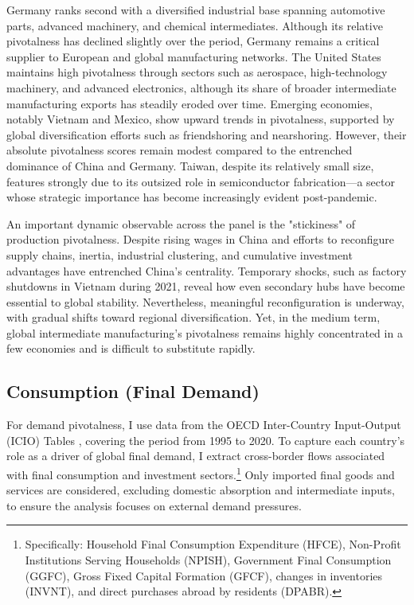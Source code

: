 \documentclass[11pt]{article}
\begin{document}
Germany ranks second with a diversified industrial base spanning automotive parts, advanced machinery, and chemical intermediates. Although its relative pivotalness has declined slightly over the period, Germany remains a critical supplier to European and global manufacturing networks. The United States maintains high pivotalness through sectors such as aerospace, high-technology machinery, and advanced electronics, although its share of broader intermediate manufacturing exports has steadily eroded over time. Emerging economies, notably Vietnam and Mexico, show upward trends in pivotalness, supported by global diversification efforts such as friendshoring and nearshoring. However, their absolute pivotalness scores remain modest compared to the entrenched dominance of China and Germany. Taiwan, despite its relatively small size, features strongly due to its outsized role in semiconductor fabrication—a sector whose strategic importance has become increasingly evident post-pandemic.

An important dynamic observable across the panel is the "stickiness" of production pivotalness. Despite rising wages in China and efforts to reconfigure supply chains, inertia, industrial clustering, and cumulative investment advantages have entrenched China’s centrality. Temporary shocks, such as factory shutdowns in Vietnam during 2021, reveal how even secondary hubs have become essential to global stability. Nevertheless, meaningful reconfiguration is underway, with gradual shifts toward regional diversification. Yet, in the medium term, global intermediate manufacturing's pivotalness remains highly concentrated in a few economies and is difficult to substitute rapidly.

\subsection{Consumption (Final Demand)}

For demand pivotalness, I use data from the OECD Inter-Country Input-Output (ICIO) Tables \citep{oecdicio2023}, covering the period from 1995 to 2020. To capture each country’s role as a driver of global final demand, I extract cross-border flows associated with final consumption and investment sectors.\footnote{Specifically: Household Final Consumption Expenditure (HFCE), Non-Profit Institutions Serving Households (NPISH), Government Final Consumption (GGFC), Gross Fixed Capital Formation (GFCF), changes in inventories (INVNT), and direct purchases abroad by residents (DPABR).} Only imported final goods and services are considered, excluding domestic absorption and intermediate inputs, to ensure the analysis focuses on external demand pressures.
\end{document}
